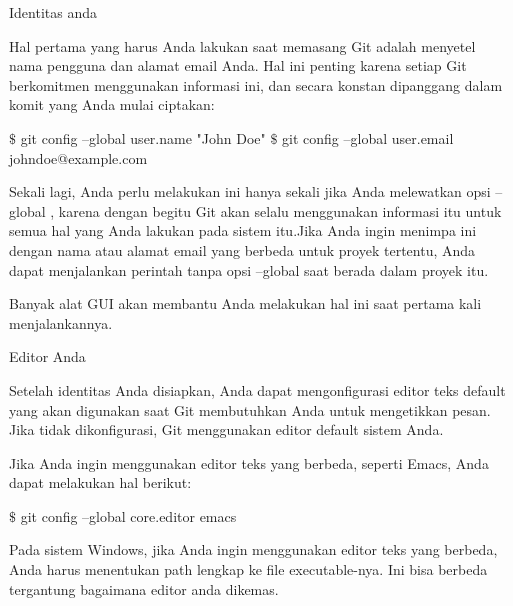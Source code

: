 \vspace{12pt}
\noindent 
Identitas anda \par
\vspace{12pt}
\noindent 
Hal pertama yang harus Anda lakukan saat memasang Git adalah menyetel nama pengguna dan alamat email Anda. $  $Hal ini penting karena setiap Git berkomitmen menggunakan informasi ini, dan secara konstan dipanggang dalam komit yang Anda mulai ciptakan: \par
\vspace{12pt}
\noindent 
  $  \$  $ git config --global user.name "John Doe"  $  \$  $ git config --global user.email johndoe@example.com \par
\vspace{12pt}
\noindent 
Sekali lagi, Anda perlu melakukan ini hanya sekali jika Anda melewatkan opsi $  $--global $  $, karena dengan begitu Git akan selalu menggunakan informasi itu untuk semua hal yang Anda lakukan pada sistem itu.Jika Anda ingin menimpa ini dengan nama atau alamat email yang berbeda untuk proyek tertentu, Anda dapat menjalankan perintah tanpa opsi $  $--global $  $saat berada dalam proyek itu. \par
\vspace{12pt}
\noindent 
Banyak alat GUI akan membantu Anda melakukan hal ini saat pertama kali menjalankannya. \par
\vspace{12pt}
\noindent 
Editor Anda \par
\vspace{12pt}
\noindent 
Setelah identitas Anda disiapkan, Anda dapat mengonfigurasi editor teks default yang akan digunakan saat Git membutuhkan Anda untuk mengetikkan pesan. $  $Jika tidak dikonfigurasi, Git menggunakan editor default sistem Anda. \par
\vspace{12pt}
\noindent 
Jika Anda ingin menggunakan editor teks yang berbeda, seperti Emacs, Anda dapat melakukan hal berikut: \par
\vspace{12pt}
\noindent 
  $  \$  $ git config --global core.editor emacs  \par
\vspace{12pt}
\noindent 
Pada sistem Windows, jika Anda ingin menggunakan editor teks yang berbeda, Anda harus menentukan path lengkap ke file executable-nya. $  $Ini bisa berbeda tergantung bagaimana editor anda dikemas. \par
\vspace{12pt}
